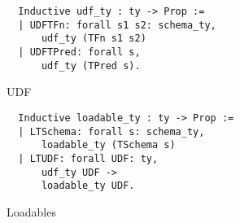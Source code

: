 \begin{figure}
\begin{lstlisting}
  Inductive udf_ty : ty -> Prop :=
  | UDFTFn: forall s1 s2: schema_ty,
      udf_ty (TFn s1 s2)
  | UDFTPred: forall s,
      udf_ty (TPred s).
\end{lstlisting}
\caption{UDF}
\label{fig-udf}
\end{figure}

\begin{figure}
\begin{lstlisting}
  Inductive loadable_ty : ty -> Prop :=
  | LTSchema: forall s: schema_ty,
      loadable_ty (TSchema s)
  | LTUDF: forall UDF: ty,
      udf_ty UDF ->
      loadable_ty UDF.
\end{lstlisting}
\caption{Loadables}
\label{fig-loadable}
\end{figure}



%

